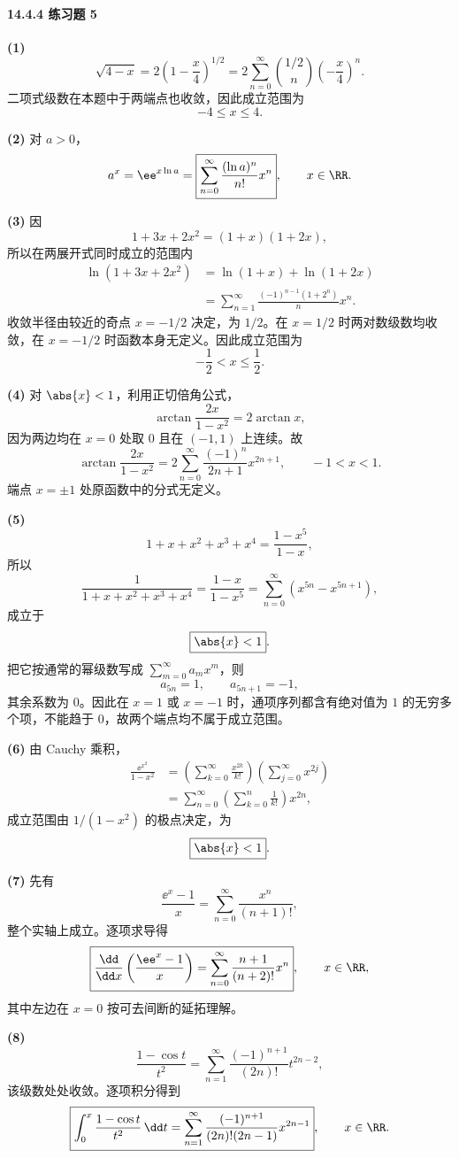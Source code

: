 \paragraph{14.4.4 练习题 5}
\begin{xsolution}
\textbf{(1)}
\[
  \sqrt{4-x}=2\left(1-\frac x4\right)^{1/2}
  =2\sum_{n=0}^{\infty}{1/2\choose n}\left(-\frac x4\right)^n.
\]
二项式级数在本题中于两端点也收敛，因此成立范围为
\[
  \boxed{-4\leqslant x\leqslant4}.
\]

\textbf{(2)} 对 $a>0$，
\[
  a^x=\ee^{x\ln a}
  =\boxed{\sum_{n=0}^{\infty}\frac{(\ln a)^n}{n!}x^n},
  \qquad x\in\RR.
\]

\textbf{(3)} 因
\[
  1+3x+2x^2=(1+x)(1+2x),
\]
所以在两展开式同时成立的范围内
\[
\begin{aligned}
  \ln(1+3x+2x^2)
  &=\ln(1+x)+\ln(1+2x)\\
  &=\sum_{n=1}^{\infty}\frac{(-1)^{n-1}(1+2^n)}n x^n.
\end{aligned}
\]
收敛半径由较近的奇点 $x=-1/2$ 决定，为 $1/2$。在 $x=1/2$ 时两对数级数均收敛，在 $x=-1/2$ 时函数本身无定义。因此成立范围为
\[
  \boxed{-\frac12<x\leqslant\frac12}.
\]

\textbf{(4)} 对 $\abs{x}<1$，利用正切倍角公式，
\[
  \arctan\frac{2x}{1-x^2}=2\arctan x,
\]
因为两边均在 $x=0$ 处取 $0$ 且在 $(-1,1)$ 上连续。故
\[
  \boxed{
  \arctan\frac{2x}{1-x^2}
  =2\sum_{n=0}^{\infty}\frac{(-1)^n}{2n+1}x^{2n+1}},
  \qquad -1<x<1.
\]
端点 $x=\pm1$ 处原函数中的分式无定义。

\textbf{(5)}
\[
  1+x+x^2+x^3+x^4=\frac{1-x^5}{1-x},
\]
所以
\[
  \frac1{1+x+x^2+x^3+x^4}
  =\frac{1-x}{1-x^5}
  =\boxed{\sum_{n=0}^{\infty}(x^{5n}-x^{5n+1})},
\]
成立于
\[
  \boxed{\abs{x}<1}.
\]
把它按通常的幂级数写成 $\sum_{m=0}^{\infty}a_mx^m$，则
\[
  a_{5n}=1,\qquad a_{5n+1}=-1,
\]
其余系数为 $0$。因此在 $x=1$ 或 $x=-1$ 时，通项序列都含有绝对值为 $1$ 的无穷多个项，不能趋于 $0$，故两个端点均不属于成立范围。

\textbf{(6)} 由 Cauchy 乘积，
\[
\begin{aligned}
  \frac{\ee^{x^2}}{1-x^2}
  &=\left(\sum_{k=0}^{\infty}\frac{x^{2k}}{k!}\right)
    \left(\sum_{j=0}^{\infty}x^{2j}\right)\\
  &=\boxed{\sum_{n=0}^{\infty}\left(\sum_{k=0}^{n}\frac1{k!}\right)x^{2n}},
\end{aligned}
\]
成立范围由 $1/(1-x^2)$ 的极点决定，为
\[
  \boxed{\abs{x}<1}.
\]

\textbf{(7)} 先有
\[
  \frac{\ee^x-1}{x}=\sum_{n=0}^{\infty}\frac{x^n}{(n+1)!},
\]
整个实轴上成立。逐项求导得
\[
  \boxed{
  \frac{\dd}{\dd x}\left(\frac{\ee^x-1}{x}\right)
  =\sum_{n=0}^{\infty}\frac{n+1}{(n+2)!}x^n},
  \qquad x\in\RR,
\]
其中左边在 $x=0$ 按可去间断的延拓理解。

\textbf{(8)}
\[
  \frac{1-\cos t}{t^2}
  =\sum_{n=1}^{\infty}\frac{(-1)^{n+1}}{(2n)!}t^{2n-2},
\]
该级数处处收敛。逐项积分得到
\[
  \boxed{
  \int_0^x\frac{1-\cos t}{t^2}\,\dd t
  =\sum_{n=1}^{\infty}
  \frac{(-1)^{n+1}}{(2n)!(2n-1)}x^{2n-1}},
  \qquad x\in\RR.
\]
\end{xsolution}


